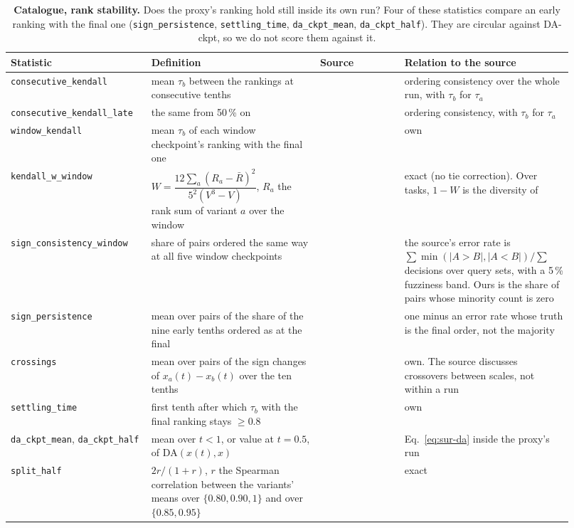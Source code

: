\begin{table}[t]
\centering
\scriptsize
\begin{tabular}{@{}p{0.215\linewidth}p{0.28\linewidth}p{0.14\linewidth}p{0.285\linewidth}@{}}
\toprule
\textbf{Statistic} & \textbf{Definition} & \textbf{Source} & \textbf{Relation to the source} \\
\midrule
\texttt{consecutive\_kendall} & mean $\tau_b$ between the rankings at consecutive tenths & \citet{kydlicek_finetasks_nodate} & ordering consistency over the whole run, with $\tau_b$ for $\tau_a$ \\
\texttt{consecutive\_kendall\_late} & the same from 50\,\% on & \citet{kydlicek_finetasks_nodate} & ordering consistency, with $\tau_b$ for $\tau_a$ \\
\texttt{window\_kendall} & mean $\tau_b$ of each window checkpoint's ranking with the final one & \citet{heineman_signal_2025} & own \\
\texttt{kendall\_w\_window} & $W = \dfrac{12\sum_a (R_a - \bar{R})^2}{5^2 (V^3 - V)}$, $R_a$ the rank sum of variant $a$ over the window & \citet{kendall_problem_1939} & exact (no tie correction). Over tasks, $1 - W$ is the diversity of \citet{zhang_inherent_2024} \\
\texttt{sign\_consistency\_window} & share of pairs ordered the same way at all five window checkpoints & \citet{buckley_evaluating_2000} & the source's error rate is $\sum \min(|A{>}B|, |A{<}B|) / \sum$ decisions over query sets, with a 5\,\% fuzziness band. Ours is the share of pairs whose minority count is zero \\
\texttt{sign\_persistence} & mean over pairs of the share of the nine early tenths ordered as at the final & \citet{buckley_evaluating_2000} & one minus an error rate whose truth is the final order, not the majority \\
\texttt{crossings} & mean over pairs of the sign changes of $x_a(t) - x_b(t)$ over the ten tenths & \citet{magnusson_datadecide_2025} & own. The source discusses crossovers between scales, not within a run \\
\texttt{settling\_time} & first tenth after which $\tau_b$ with the final ranking stays $\geq 0.8$ & \citet{magnusson_datadecide_2025} & own \\
\texttt{da\_ckpt\_mean}, \texttt{da\_ckpt\_half} & mean over $t < 1$, or value at $t = 0.5$, of $\mathrm{DA}(x(t), x)$ & \citet{heineman_signal_2025, magnusson_datadecide_2025} & Eq.~\ref{eq:sur-da} inside the proxy's run \\
\texttt{split\_half} & $2r/(1+r)$, $r$ the Spearman correlation between the variants' means over $\{0.80, 0.90, 1\}$ and over $\{0.85, 0.95\}$ & \citet{spearman_correlation_1910, brown_experimental_1910} & exact \\
\bottomrule
\end{tabular}
\caption{\textbf{Catalogue, rank stability.} Does the proxy's ranking hold still inside its own run? Four of these statistics compare an early ranking with the final one (\texttt{sign\_persistence}, \texttt{settling\_time}, \texttt{da\_ckpt\_mean}, \texttt{da\_ckpt\_half}). They are circular against DA-ckpt, so we do not score them against it.}
\label{tab:sur-stability}
\end{table}


